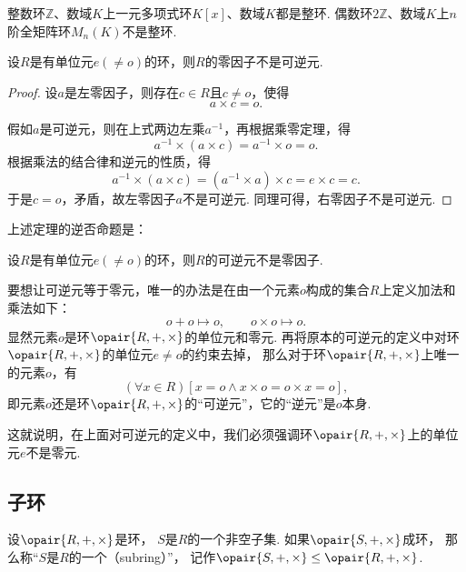 \begin{example}
整数环\(\mathbb{Z}\)、数域\(K\)上一元多项式环\(K[x]\)、数域\(K\)都是整环.
偶数环\(2\mathbb{Z}\)、数域\(K\)上\(n\)阶全矩阵环\(M_n(K)\)不是整环.
\end{example}

\begin{theorem}
设\(R\)是有单位元\(e(\neq o)\)的环，则\(R\)的零因子不是可逆元.
\begin{proof}
设\(a\)是左零因子，则存在\(c \in R\)且\(c \neq o\)，使得\[
	a \times c = o.
\]

假如\(a\)是可逆元，则在上式两边左乘\(a^{-1}\)，再根据乘零定理，得\[
	a^{-1} \times (a \times c) = a^{-1} \times o = o.
\]
根据乘法的结合律和逆元的性质，得\[
	a^{-1} \times (a \times c) = (a^{-1} \times a) \times c = e \times c = c.
\]
于是\(c = o\)，矛盾，故左零因子\(a\)不是可逆元.
同理可得，右零因子不是可逆元.
\end{proof}
\end{theorem}

上述定理的逆否命题是：
\begin{corollary}
设\(R\)是有单位元\(e(\neq o)\)的环，则\(R\)的可逆元不是零因子.
\end{corollary}

\begin{example}
要想让可逆元等于零元，唯一的办法是在由一个元素\(o\)构成的集合\(R\)上定义加法和乘法如下：\[
	o + o \mapsto o,
	\qquad
	o \times o \mapsto o.
\]
显然元素\(o\)是环\(\opair{R,+,\times}\)的单位元和零元.
再将原本的可逆元的定义中对环\(\opair{R,+,\times}\)的单位元\(e \neq o\)的约束去掉，
那么对于环\(\opair{R,+,\times}\)上唯一的元素\(o\)，有\[
	(\forall x \in R)[x = o \land x \times o = o \times x = o],
\]
即元素\(o\)还是环\(\opair{R,+,\times}\)的“可逆元”，它的“逆元”是\(o\)本身.

这就说明，在上面对可逆元的定义中，我们必须强调环\(\opair{R,+,\times}\)上的单位元\(e\)不是零元.
\end{example}

\subsection{子环}
\begin{definition}
设\(\opair{R,+,\times}\)是环，
\(S\)是\(R\)的一个非空子集.
如果\(\opair{S,+,\times}\)成环，
那么称“\(S\)是\(R\)的一个（subring）”，
记作\(\opair{S,+,\times}\AlgebraSubstructure\opair{R,+,\times}\).
\end{definition}

